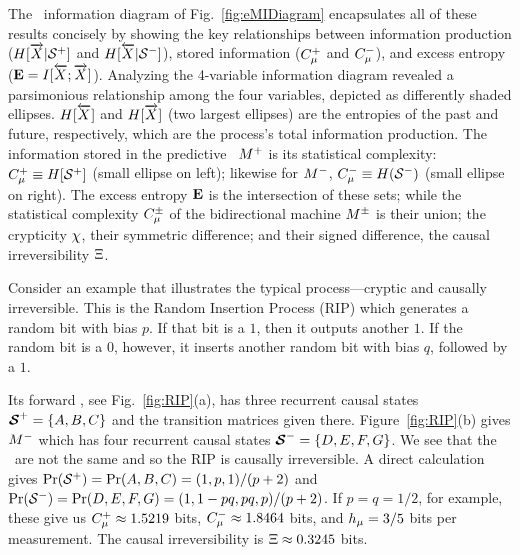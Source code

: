\documentclass[prl,twocolumn,showpacs,superscriptaddress,preprintnumbers,floatfix]{revtex4}
\theoremstyle{plain}    \newtheorem{Lem}{Lemma}
\theoremstyle{plain}    \newtheorem*{ProLem}{Proof}
\theoremstyle{plain} 	\newtheorem{Cor}{Corollary}
\theoremstyle{plain} 	\newtheorem*{ProCor}{Proof}
\theoremstyle{plain} 	\newtheorem{The}{Theorem}
\theoremstyle{plain} 	\newtheorem*{ProThe}{Proof}
\theoremstyle{plain} 	\newtheorem{Prop}{Proposition}
\theoremstyle{plain} 	\newtheorem*{ProProp}{Proof}
\theoremstyle{plain} 	\newtheorem*{Conj}{Conjecture}
\theoremstyle{plain}	\newtheorem*{Rem}{Remark}
\theoremstyle{plain}	\newtheorem*{Def}{Definition}
\theoremstyle{plain}	\newtheorem*{Not}{Notation}
\begin{document}
The \eM\ information diagram of Fig.~\ref{fig:eMIDiagram} encapsulates all
of these results concisely by showing the key relationships between
information production ($H[\overrightarrow{{X}}|{\mathcal{S}}^+]$ and 
$H[\overleftarrow {{X}}|{\mathcal{S}}^-]$), stored information 
($C_\mu^+$ and $C_\mu^-$), and excess entropy 
(\mbox{${\bf E} = I[\overleftarrow {{X}};\overrightarrow{{X}}]$}).  Analyzing the 4-variable information 
diagram revealed a parsimonious relationship among the four variables, 
depicted as differently shaded ellipses. $H[\overleftarrow {{X}}]$ and $H[\overrightarrow{{X}}]$
(two largest ellipses) are the entropies of the past and future, respectively,
which are the process's total information production. The information stored
in the predictive \eM\ ${M}^+$ is its statistical complexity:
$C_\mu^+ \equiv H[{\mathcal{S}}^+]$ (small ellipse on left); likewise
for ${M}^-$, $C_\mu^- \equiv H({\mathcal{S}}^-)$ (small ellipse on right).
The excess entropy ${\bf E}$ is the intersection of these sets; while the
statistical complexity $C_\mu^{\pm}$ of the bidirectional machine ${M}^{\pm}$ is their
union; the crypticity $\chi$, their symmetric difference; and
their signed difference, the causal irreversibility $\Xi$.

Consider an example that illustrates the typical process---cryptic
and causally irreversible. This is the Random Insertion Process (RIP) which
generates a random bit with bias $p$. If that bit is a $1$, then it outputs
another $1$. If the random bit is a $0$, however, it inserts another random
bit with bias $q$, followed by a $1$.

Its forward \eM, see Fig.~\ref{fig:RIP}(a), has three recurrent causal states
${\boldsymbol{\mathcal{S}}}^+ = \{ A, B, C \}$ and the transition matrices given there.
Figure~\ref{fig:RIP}(b) gives ${M}^-$ which has four recurrent causal states
${\boldsymbol{\mathcal{S}}}^- = \{ D, E, F, G \}$. We see that the \eMs\ are not the
same and so the RIP is causally irreversible. A direct calculation gives
${\Pr}({\mathcal{S}}^+) = {\Pr}(A,B,C) = (1, p, 1) / (p+2)$ and
${\Pr}({\mathcal{S}}^-) = {\Pr}(D,E,F,G) = (1, 1-pq, pq, p) / (p+2)$. If
$p = q = 1/2$, for example, these give us $C_\mu^+ \approx 1.5219$ bits,
$C_\mu^- \approx 1.8464$ bits, and ${h_\mu} = 3/5$ bits per measurement.
The causal irreversibility is $\Xi \approx 0.3245$ bits.
\end{document}

